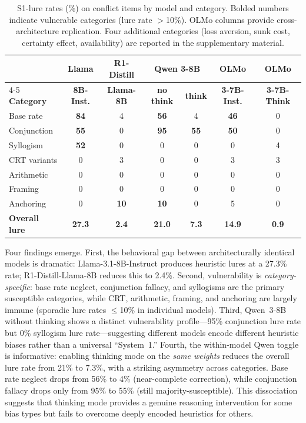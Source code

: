\documentclass[accepted]{article}
\begin{document}
\begin{table}[t]
\centering
\caption{S1-lure rates (\%) on conflict items by model and category.
  Bolded numbers indicate vulnerable categories (lure rate $>$10\%).
  OLMo columns provide cross-architecture replication.
  Four additional categories (loss aversion, sunk cost, certainty effect,
  availability) are reported in the supplementary material.}
\label{tab:behavioral}
\vspace{4pt}
\small
\begin{tabular}{lcccccc}
\toprule
& \textbf{Llama} & \textbf{R1-Distill} & \multicolumn{2}{c}{\textbf{Qwen 3-8B}} & \textbf{OLMo} & \textbf{OLMo} \\
\cmidrule(lr){4-5}
\textbf{Category} & \textbf{8B-Inst.} & \textbf{Llama-8B} & \textbf{no think} & \textbf{think} & \textbf{3-7B-Inst.} & \textbf{3-7B-Think} \\
\midrule
Base rate      & \textbf{84} & 4   & \textbf{56} & 4   & \textbf{46} & 0 \\
Conjunction    & \textbf{55} & 0   & \textbf{95} & \textbf{55} & \textbf{50} & 0 \\
Syllogism      & \textbf{52} & 0   & 0   & 0   & 0   & 4 \\
\midrule
CRT variants   & 0   & 3   & 0   & 0   & 3   & 3 \\
Arithmetic     & 0   & 0   & 0   & 0   & 0   & 0 \\
Framing        & 0   & 0   & 0   & 0   & 0   & 0 \\
Anchoring      & 0   & \textbf{10} & \textbf{10} & 0 & 5 & 0 \\
\midrule
\textbf{Overall lure} & \textbf{27.3} & \textbf{2.4} & \textbf{21.0} & \textbf{7.3} & \textbf{14.9} & \textbf{0.9} \\
\bottomrule
\end{tabular}
\end{table}

Four findings emerge.  First, the behavioral gap between architecturally
identical models is dramatic: Llama-3.1-8B-Instruct produces heuristic
lures at a 27.3\% rate; R1-Distill-Llama-8B reduces this to 2.4\%.
Second, vulnerability is \emph{category-specific}: base rate neglect,
conjunction fallacy, and syllogisms are the primary susceptible categories,
while CRT, arithmetic, framing, and anchoring are largely immune
(sporadic lure rates $\leq$10\% in individual models).  Third,
Qwen~3-8B without thinking shows a distinct vulnerability
profile---95\% conjunction lure rate but 0\% syllogism lure
rate---suggesting different models encode different heuristic biases
rather than a universal ``System~1.''  Fourth, the within-model Qwen
toggle is informative: enabling thinking mode on the \emph{same weights}
reduces the overall lure rate from 21\% to 7.3\%, with a striking
asymmetry across categories.  Base rate neglect drops from 56\% to 4\%
(near-complete correction), while conjunction fallacy drops only from
95\% to 55\% (still majority-susceptible).  This dissociation suggests
that thinking mode provides a genuine reasoning intervention for some
bias types but fails to overcome deeply encoded heuristics for others.
\end{document}
